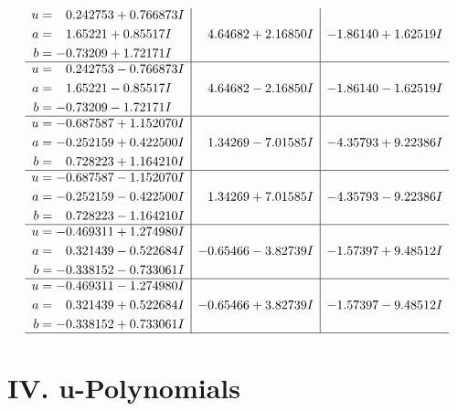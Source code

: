 \documentclass[1p]{elsarticle_modified}
\theoremstyle{definition}
\begin{document}
$$\begin{array}{c|c|c}
\begin{aligned}
u &= \phantom{-}0.242753 + 0.766873 I \\
a &= \phantom{-}1.65221 + 0.85517 I \\
b &= -0.73209 + 1.72171 I\end{aligned}
 & \phantom{-}4.64682 + 2.16850 I & -1.86140 + 1.62519 I \\ \hline\begin{aligned}
u &= \phantom{-}0.242753 - 0.766873 I \\
a &= \phantom{-}1.65221 - 0.85517 I \\
b &= -0.73209 - 1.72171 I\end{aligned}
 & \phantom{-}4.64682 - 2.16850 I & -1.86140 - 1.62519 I \\ \hline\begin{aligned}
u &= -0.687587 + 1.152070 I \\
a &= -0.252159 + 0.422500 I \\
b &= \phantom{-}0.728223 + 1.164210 I\end{aligned}
 & \phantom{-}1.34269 - 7.01585 I & -4.35793 + 9.22386 I \\ \hline\begin{aligned}
u &= -0.687587 - 1.152070 I \\
a &= -0.252159 - 0.422500 I \\
b &= \phantom{-}0.728223 - 1.164210 I\end{aligned}
 & \phantom{-}1.34269 + 7.01585 I & -4.35793 - 9.22386 I \\ \hline\begin{aligned}
u &= -0.469311 + 1.274980 I \\
a &= \phantom{-}0.321439 - 0.522684 I \\
b &= -0.338152 - 0.733061 I\end{aligned}
 & -0.65466 - 3.82739 I & -1.57397 + 9.48512 I \\ \hline\begin{aligned}
u &= -0.469311 - 1.274980 I \\
a &= \phantom{-}0.321439 + 0.522684 I \\
b &= -0.338152 + 0.733061 I\end{aligned}
 & -0.65466 + 3.82739 I & -1.57397 - 9.48512 I\\
 \hline 
 \end{array}$$\newpage
\newpage\renewcommand{\arraystretch}{1}
\centering \section*{ IV. u-Polynomials}
\end{document}
